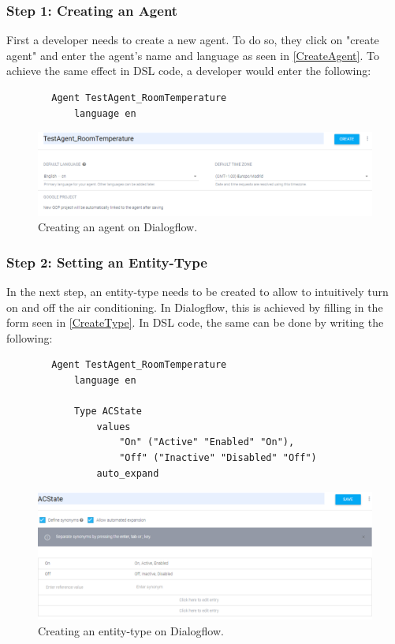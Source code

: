 \subsubsection{Step 1: Creating an Agent}
First a developer needs to create a new agent. To do so, they click on "create agent" and enter the agent's name and language as seen in \autoref{CreateAgent}.
To achieve the same effect in DSL code, a developer would enter the following:
\begin{samepage}
    \begin{lstlisting}
        Agent TestAgent_RoomTemperature
            language en 
    \end{lstlisting}
\end{samepage}

\begin{figure}[ht]
    \centering
    \includegraphics[width=1\textwidth]{Thesis_Images/CreateAgent.PNG}
    \caption{Creating an agent on Dialogflow.}
        \label{CreateAgent}
\end{figure}

\subsubsection{Step 2: Setting an Entity-Type}
In the next step, an entity-type needs to be created to allow to intuitively turn on and off the air conditioning.
In Dialogflow, this is achieved by filling in the form seen in \autoref{CreateType}.
In DSL code, the same can be done by writing the following:
\begin{samepage}    
    \begin{lstlisting}
        Agent TestAgent_RoomTemperature
            language en 
        
            Type ACState
                values 
                    "On" ("Active" "Enabled" "On"),
                    "Off" ("Inactive" "Disabled" "Off")
                auto_expand
    \end{lstlisting}
\end{samepage}

\begin{figure}[ht]
    \centering
    \includegraphics[width=1\textwidth]{Thesis_Images/CreateType.PNG}
    \caption{Creating an entity-type on Dialogflow.}
        \label{CreateType}
\end{figure}

